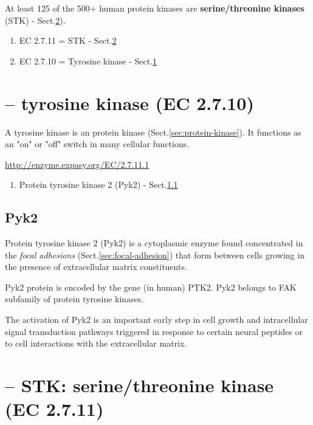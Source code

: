 At least 125 of the 500+ human protein kinases are {\bf serine/threonine
kinases} (STK) - Sect.\ref{sec:STK}). 
\begin{enumerate}
  \item EC 2.7.11 = STK - Sect.\ref{sec:STK}
  \item EC 2.7.10 = Tyrosine kinase - Sect.\ref{sec:tyrosine-kinase}
\end{enumerate}

\section{-- tyrosine kinase (EC 2.7.10)}
\label{sec:tyrosine-kinase}


A tyrosine kinase is an protein kinase (Sect.\ref{sec:protein-kinase}).
It functions as an "on" or "off" switch in many cellular functions. 


\url{http://enzyme.expasy.org/EC/2.7.11.1}
\begin{enumerate}
  \item Protein tyrosine kinase 2 (Pyk2) - Sect.\ref{sec:Pyk2}
\end{enumerate}


\subsection{Pyk2}
\label{sec:Pyk2}
\label{sec:Protein-tyrosine-kinase-2}

Protein tyrosine kinase 2 (Pyk2) is a cytoplasmic enzyme found concentrated in
the {\it focal adhesions} (Sect.\ref{sec:focal-adhesion}) that form between
cells growing in the presence of extracellular matrix constituents.

Pyk2 protein is encoded by the gene (in human) PTK2. Pyk2 belongs to  FAK
subfamily of protein tyrosine kinases.

The activation of Pyk2 is an important early step in cell growth and
intracellular signal transduction pathways triggered in response to certain
neural peptides or to cell interactions with the extracellular matrix.



\section{-- STK: serine/threonine kinase (EC 2.7.11)}
\label{sec:STK}
\label{sec:serine-thereonine_protein-kinases}

